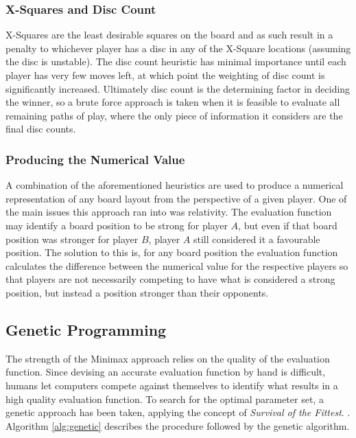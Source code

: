 \documentclass[12pt,a4paper]{article}
\begin{document}
\subsubsection*{X-Squares and Disc Count}

X-Squares are the least desirable squares on the board and as such result in a penalty to whichever player has a disc in any of the X-Square locations (assuming the disc is unstable). The disc count heuristic has minimal importance until each player has very few moves left, at which point the weighting of disc count is significantly increased. Ultimately disc count is the determining factor in deciding the winner, so a brute force approach is taken when it is feasible to evaluate all remaining paths of play, where the only piece of information it considers are the final disc counts.

\subsubsection*{Producing the Numerical Value}

A combination of the aforementioned heuristics are used to produce a numerical representation of any board layout from the perspective of a given player. One of the main issues this approach ran into was relativity. The evaluation function may identify a board position to be strong for player $A$, but even if that board position was stronger for player $B$, player $A$ still considered it a favourable position. The solution to this is, for any board position the evaluation function calculates the difference between the numerical value for the respective players so that players are not necessarily competing to have what is considered a strong position, but instead a position stronger than their opponents.

\subsection{Genetic Programming}

The strength of the Minimax approach relies on the quality of the evaluation function. Since devising an accurate evaluation function by hand is difficult, humans let computers compete against themselves to identify what results in a high quality evaluation function. To search for the optimal parameter set, a genetic approach has been taken, applying the concept of \textit{Survival of the Fittest}. \cite{eskin1999genetic}. Algorithm \ref{alg:genetic} describes the procedure followed by the genetic algorithm.
\end{document}
